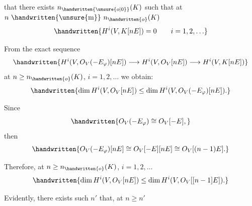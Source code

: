 that there exists $n_{\handwritten{\unsure{o|0}}}(K)$ such that at $n\ \handwritten{\unsure{\mathrm{m}}}\ n_{\handwritten{o}}(K)$
\[
\handwritten{H^i(V,K[nE])=0\qquad i=1,2,\ldots}
\]

From the exact sequence
\[
\handwritten{H^i(V,O_V(-E_\varphi)[nE])\longrightarrow H^i(V,O_V[nE])\longrightarrow H^i(V,K[nE])}
\]
at $n\geq n_{\handwritten{o}}(K)$, $i=1,2,\ldots$ we obtain:
\[
\handwritten{\dim H^i(V,O_V[nE])\leq\dim H^i(V,O_V(-E_\varphi)[nE]).}
\]

Since
\[
\handwritten{O_V(-E_\varphi)\cong O_V[-E],}
\]
then
\[
\handwritten{O_V(-E_\varphi)[nE]\cong O_V[-E][nE]\cong O_V[(n-1)E].}
\]

Therefore, at $n\geq n_{\handwritten{o}}(K)$, $i=1,2,\ldots$
\[
\handwritten{\dim H^i(V,O_V[nE])\leq\dim H^i(V,O_V[[n-1]E]).}
\]

Evidently, there exists such $n'$ that, at $n\geq n'$
